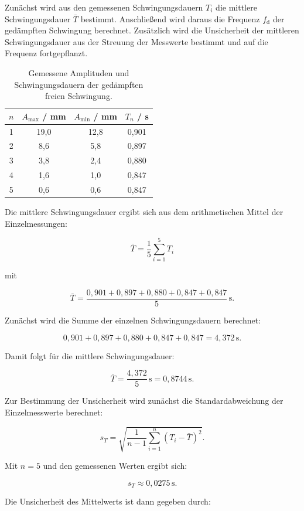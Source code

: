 \documentclass{report}
\begin{document}
Zunächst wird aus den gemessenen Schwingungsdauern $T_i$ die mittlere Schwingungsdauer $\bar{T}$ bestimmt. Anschließend wird daraus die Frequenz $f_\mathrm{d}$ der gedämpften Schwingung berechnet. Zusätzlich wird die Unsicherheit der mittleren Schwingungsdauer aus der Streuung der Messwerte bestimmt und auf die Frequenz fortgepflanzt.

\begin{table}[h]
    \centering
    \begin{tabular}{c c c c}
        \hline
        $n$ & $A_{\mathrm{max}}$ / mm & $A_{\mathrm{min}}$ / mm & $T_n$ / s \\
        \hline
        1 & 19{,}0 & 12{,}8 & 0{,}901 \\
        2 & 8{,}6  & 5{,}8  & 0{,}897 \\
        3 & 3{,}8  & 2{,}4  & 0{,}880 \\
        4 & 1{,}6  & 1{,}0  & 0{,}847 \\
        5 & 0{,}6  & 0{,}6  & 0{,}847 \\
        \hline
    \end{tabular}
    \caption{Gemessene Amplituden und Schwingungsdauern der gedämpften freien Schwingung.}
\end{table}

Die mittlere Schwingungsdauer ergibt sich aus dem arithmetischen Mittel der Einzelmessungen:

\[
\bar{T} = \frac{1}{5}\sum_{i=1}^{5} T_i
\]

mit

\[
\bar{T} = \frac{0{,}901 + 0{,}897 + 0{,}880 + 0{,}847 + 0{,}847}{5}\,\mathrm{s}.
\]

Zunächst wird die Summe der einzelnen Schwingungsdauern berechnet:

\[
0{,}901 + 0{,}897 + 0{,}880 + 0{,}847 + 0{,}847 = 4{,}372\,\mathrm{s}.
\]

Damit folgt für die mittlere Schwingungsdauer:

\[
\bar{T} = \frac{4{,}372}{5}\,\mathrm{s} = 0{,}8744\,\mathrm{s}.
\]

Zur Bestimmung der Unsicherheit wird zunächst die Standardabweichung der Einzelmesswerte berechnet:

\[
s_T = \sqrt{\frac{1}{n-1}\sum_{i=1}^{n}(T_i-\bar{T})^2}.
\]

Mit $n=5$ und den gemessenen Werten ergibt sich:

\[
s_T \approx 0{,}0275\,\mathrm{s}.
\]

Die Unsicherheit des Mittelwerts ist dann gegeben durch:
\end{document}
